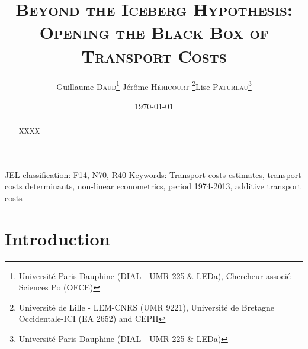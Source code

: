 \documentclass[a4paper,11pt]{article}
\begin{document}
\date{\today}
\title{\textsc{Beyond the Iceberg Hypothesis: \\Opening the Black Box of Transport Costs}} %
\author{Guillaume \textsc{Daud}\thanks{%
Universit\'{e} Paris Dauphine (DIAL - UMR 225 \& LEDa), Chercheur associ\'{e} - Sciences Po (OFCE)}  \qquad J\'{e}r\^{o}me \textsc{H\'{e}ricourt} \thanks{Universit\'{e} de Lille - LEM-CNRS (UMR 9221), Universit\'{e} de Bretagne Occidentale-ICI (EA 2652) and CEPII}\qquad Lise \textsc{Patureau}\thanks{Universit\'{e} Paris Dauphine (DIAL - UMR 225 \& LEDa)} } \maketitle


\bigskip

\begin{abstract}


\begin{spacing}{1.2}

{\normalsize XXXX}

{\normalsize \bigskip }

\end{spacing}
\end{abstract}

\thispagestyle{empty} \pagestyle{plain} \setcounter{page}{1}



{\normalsize JEL classification: F14, N70, R40\newline
Keywords: Transport costs estimates, transport costs determinants, non-linear econometrics, period 1974-2013, additive transport costs }

{\normalsize \vspace{0cm} }

{\normalsize \titlepage }

{\normalsize \newpage }


\section{Introduction}
\end{document}

